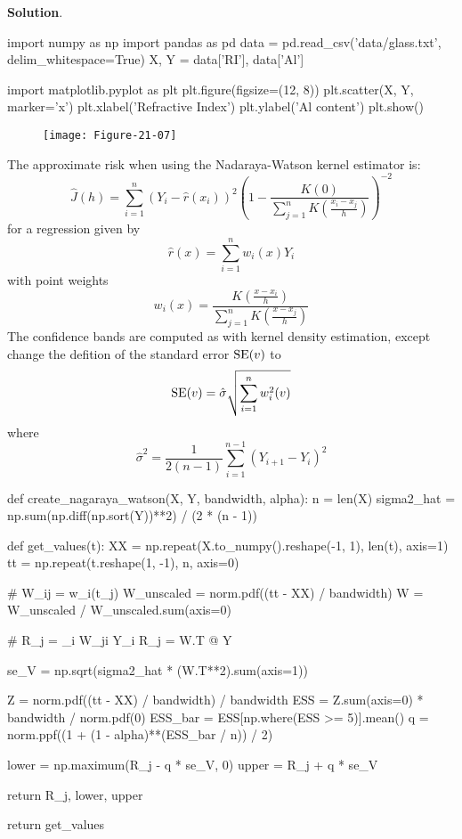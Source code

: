 \textbf{Solution}.

\begin{python}
import numpy as np
import pandas as pd
data = pd.read_csv('data/glass.txt', delim_whitespace=True)
X, Y = data['RI'], data['Al']
\end{python}

\begin{python}
import matplotlib.pyplot as plt
plt.figure(figsize=(12, 8))
plt.scatter(X, Y, marker='x')
plt.xlabel('Refractive Index')
plt.ylabel('Al content')
plt.show()
\end{python}

\begin{figure}[H]
\centering
\texttt{[image: Figure-21-07]}
\end{figure}

The approximate risk when using the Nadaraya-Watson kernel estimator is:
\[
\hat{J}(h) = \sum_{i=1}^{n} (Y_{i} - \hat{r}(x_{i}))^{2} \left( 1 - \frac{K(0)}{\sum_{j=1}^{n} K \left( \frac{x_{i} - x_{j}}{h} \right)} \right)^{-2}
\]
for a regression given by
\[
\hat{r}(x) = \sum_{i=1}^{n} w_{i}(x) Y_{i}
\]
with point weights
\[
w_{i}(x) = \frac{K\left( \frac{x - x_{i}}{h} \right)}{\sum_{j=1}^{n} K\left( \frac{x - x_{j}}{h} \right)}
\]
The confidence bands are computed as with kernel density estimation,
except change the defition of the standard error \(\operatorname{\mathrm{SE}} (v)\) to
\[
\operatorname{\mathrm{SE}} (v) = \hat{\sigma} \sqrt{\sum_{i=1}^{n} w^{2}_{i}(v)}
\]
where
\[
\hat{\sigma}^{2} = \frac{1}{2(n - 1)} \sum_{i=1}^{n-1} (Y_{i+1} - Y_{i})^{2}
\]

\begin{python}
def create_nagaraya_watson(X, Y, bandwidth, alpha):
    n = len(X)
    sigma2_hat = np.sum(np.diff(np.sort(Y))**2) / (2 * (n - 1))
    
    def get_values(t):
        XX = np.repeat(X.to_numpy().reshape(-1, 1), len(t), axis=1)
        tt = np.repeat(t.reshape(1, -1), n, axis=0)
        
        # W_{i}j = w_{i}(t_{j})
        W_unscaled = norm.pdf((tt - XX) / bandwidth) 
        W = W_unscaled / W_unscaled.sum(axis=0)
        
        # R_{j} = \sum_{i} W_{j}i Y_{i}
        R_{j} = W.T @ Y
        
        se_V = np.sqrt(sigma2_hat * (W.T**2).sum(axis=1))
        
        Z = norm.pdf((tt - XX) / bandwidth) / bandwidth
        ESS = Z.sum(axis=0) * bandwidth / norm.pdf(0)
        ESS_bar = ESS[np.where(ESS >= 5)].mean()
        q = norm.ppf((1 + (1 - alpha)**(ESS_bar / n)) / 2)
        
        lower = np.maximum(R_{j} - q * se_V, 0)
        upper = R_{j} + q * se_V
        
        return R_{j}, lower, upper
        
    return get_values
\end{python}

